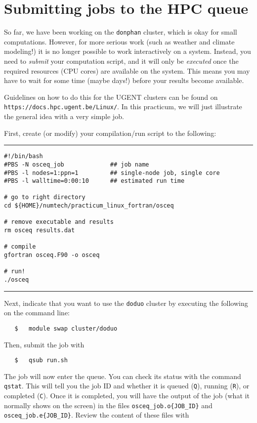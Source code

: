 \documentclass[a4paper]{article}
\begin{document}
\section{Submitting jobs to the HPC queue}
%
\par
So far, we have been working on the \texttt{donphan} cluster, which is okay for small computations. However, for more serious work (such as weather and climate modeling!) it is no longer possible to work interactively on a system. Instead, you need to \emph{submit} your computation script, and it will only be \emph{executed} once the required resources (CPU cores) are available on the system. This means you may have to wait for some time (maybe days!) before your results become available.
%
\par
Guidelines on how to do this for the UGENT clusters can be found on \texttt{https://docs.hpc.ugent.be/Linux/}. In this practicum, we will just illustrate the general idea with a very simple job.
%
\par
First, create (or modify) your compilation/run script to the following:
%
{\vspace{10pt}\hrule\small\vspace*{-2pt}\begin{verbatim}
#!/bin/bash
#PBS -N osceq_job             ## job name
#PBS -l nodes=1:ppn=1         ## single-node job, single core
#PBS -l walltime=0:00:10      ## estimated run time

# go to right directory
cd ${HOME}/numtech/practicum_linux_fortran/osceq

# remove executable and results
rm osceq results.dat

# compile
gfortran osceq.F90 -o osceq

# run!
./osceq

\end{verbatim}\hrule\vspace{5pt}}
%
\par
Next, indicate that you want to use the \texttt{doduo} cluster by executing the following on the command line:
%
\begin{verbatim}
   $   module swap cluster/doduo
\end{verbatim}
%
Then, submit the job with
%
\begin{verbatim}
   $   qsub run.sh
\end{verbatim}
%
\par
The job will now enter the queue. You can check its status with the command \texttt{qstat}. This will tell you the job ID and whether it is queued (\texttt{Q}), running (\texttt{R}), or completed (\texttt{C}). Once it is completed, you will have the output of the job (what it normally shows on the screen) in the files \texttt{osceq\_job.o\{JOB\_ID\}} and \texttt{osceq\_job.e\{JOB\_ID\}}. Review the content of these files with
\end{document}
